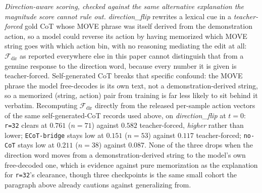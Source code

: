 \emph{Direction-aware scoring, checked against the same alternative explanation the magnitude score cannot rule out.} \emph{direction\_flip} rewrites a lexical cue in a \emph{teacher-forced} gold CoT whose MOVE phrase was itself derived from the demonstration action, so a model could reverse its action by having memorized which MOVE string goes with which action bin, with no reasoning mediating the edit at all: $\mathcal{F}_{\text{dir}}$ as reported everywhere else in this paper cannot distinguish that from a genuine response to the direction word, because every number it is given is teacher-forced. Self-generated CoT breaks that specific confound: the MOVE phrase the model free-decodes is its own text, not a demonstration-derived string, so a memorized (string, action) pair from training is far less likely to sit behind it verbatim. Recomputing $\mathcal{F}_{\text{dir}}$ directly from the released per-sample action vectors of the same self-generated-CoT records used above, on \emph{direction\_flip} at $t{=}0$: \texttt{r=32} clears at $0.761$ ($n{=}71$) against $0.582$ teacher-forced, \emph{higher} rather than lower; \texttt{ECoT-bridge} stays low at $0.151$ ($n{=}53$) against $0.117$ teacher-forced; \texttt{no-CoT} stays low at $0.211$ ($n{=}38$) against $0.087$. None of the three drops when the direction word moves from a demonstration-derived string to the model's own free-decoded one, which is evidence against pure memorization as the explanation for \texttt{r=32}'s clearance, though three checkpoints is the same small cohort the paragraph above already cautions against generalizing from.

